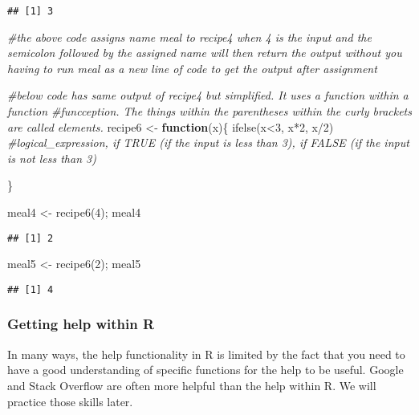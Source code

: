 \documentclass[
]{article}
\newenvironment{Shaded}{\begin{snugshade}}{\end{snugshade}}
\newcommand{\CommentTok}[1]{\textcolor[rgb]{0.56,0.35,0.01}{\textit{#1}}}
\newcommand{\ControlFlowTok}[1]{\textcolor[rgb]{0.13,0.29,0.53}{\textbf{#1}}}
\newcommand{\DecValTok}[1]{\textcolor[rgb]{0.00,0.00,0.81}{#1}}
\newcommand{\FunctionTok}[1]{\textcolor[rgb]{0.00,0.00,0.00}{#1}}
\newcommand{\NormalTok}[1]{#1}
\newcommand{\OtherTok}[1]{\textcolor[rgb]{0.56,0.35,0.01}{#1}}
\newcommand{\SpecialCharTok}[1]{\textcolor[rgb]{0.00,0.00,0.00}{#1}}
\begin{document}
\begin{verbatim}
## [1] 3
\end{verbatim}

\begin{Shaded}
\begin{Highlighting}[]
\CommentTok{\#the above code assigns name meal to recipe4 when 4 is the input and the semicolon followed by the assigned name will then return the output without you having to run meal as a new line of code to get the output after assignment}

\CommentTok{\#below code has same output of recipe4 but simplified. It uses a function within a function \#funcception. The things within the parentheses within the curly brackets are called elements.}
\NormalTok{recipe6 }\OtherTok{\textless{}{-}} \ControlFlowTok{function}\NormalTok{(x)\{}
  \FunctionTok{ifelse}\NormalTok{(x}\SpecialCharTok{\textless{}}\DecValTok{3}\NormalTok{, x}\SpecialCharTok{*}\DecValTok{2}\NormalTok{, x}\SpecialCharTok{/}\DecValTok{2}\NormalTok{) }\CommentTok{\#logical\_expression, if TRUE (if the input is less than 3), if FALSE (if the input is not less than 3)}
  
\NormalTok{\}}

\NormalTok{meal4 }\OtherTok{\textless{}{-}} \FunctionTok{recipe6}\NormalTok{(}\DecValTok{4}\NormalTok{); meal4}
\end{Highlighting}
\end{Shaded}

\begin{verbatim}
## [1] 2
\end{verbatim}

\begin{Shaded}
\begin{Highlighting}[]
\NormalTok{meal5 }\OtherTok{\textless{}{-}} \FunctionTok{recipe6}\NormalTok{(}\DecValTok{2}\NormalTok{); meal5}
\end{Highlighting}
\end{Shaded}

\begin{verbatim}
## [1] 4
\end{verbatim}

\hypertarget{getting-help-within-r}{%
\subsubsection{Getting help within R}\label{getting-help-within-r}}

In many ways, the help functionality in R is limited by the fact that
you need to have a good understanding of specific functions for the help
to be useful. Google and Stack Overflow are often more helpful than the
help within R. We will practice those skills later.
\end{document}
